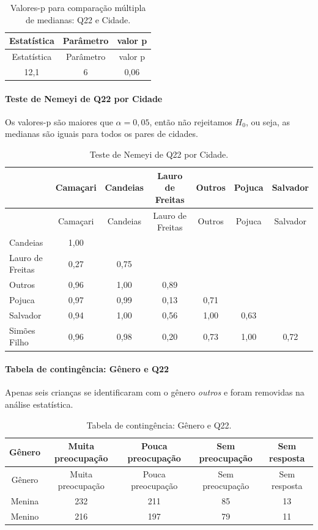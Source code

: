 \documentclass[]{article}
\let\oldparagraph\paragraph
\renewcommand{\paragraph}[1]{\oldparagraph{#1}\mbox{}}
\begin{document}
\begin{longtable}[]{@{}ccc@{}}
\caption{\label{tab:unnamed-chunk-369}Valores-p para comparação múltipla de medianas: Q22 e Cidade.}\tabularnewline
\toprule
Estatística & Parâmetro & valor p\tabularnewline
\midrule
\endfirsthead
\toprule
Estatística & Parâmetro & valor p\tabularnewline
\midrule
\endhead
12,1 & 6 & 0,06\tabularnewline
\bottomrule
\end{longtable}

\hypertarget{teste-de-nemeyi-de-q22-por-cidade}{%
\paragraph{Teste de Nemeyi de Q22 por Cidade}\label{teste-de-nemeyi-de-q22-por-cidade}}

Os valores-p são maiores que \(\alpha=0,05\), então não rejeitamos \(H_0\), ou seja, as medianas são iguais para todos os pares de cidades.

\begin{longtable}[]{@{}lcccccc@{}}
\caption{\label{tab:unnamed-chunk-370}Teste de Nemeyi de Q22 por Cidade.}\tabularnewline
\toprule
& Camaçari & Candeias & Lauro de Freitas & Outros & Pojuca & Salvador\tabularnewline
\midrule
\endfirsthead
\toprule
& Camaçari & Candeias & Lauro de Freitas & Outros & Pojuca & Salvador\tabularnewline
\midrule
\endhead
Candeias & 1,00 & & & & &\tabularnewline
Lauro de Freitas & 0,27 & 0,75 & & & &\tabularnewline
Outros & 0,96 & 1,00 & 0,89 & & &\tabularnewline
Pojuca & 0,97 & 0,99 & 0,13 & 0,71 & &\tabularnewline
Salvador & 0,94 & 1,00 & 0,56 & 1,00 & 0,63 &\tabularnewline
Simões Filho & 0,96 & 0,98 & 0,20 & 0,73 & 1,00 & 0,72\tabularnewline
\bottomrule
\end{longtable}

\cleardoublepage

\hypertarget{tabela-de-continguxeancia-guxeanero-e-q22}{%
\paragraph{Tabela de contingência: Gênero e Q22}\label{tabela-de-continguxeancia-guxeanero-e-q22}}

Apenas seis crianças se identificaram com o gênero \emph{outros} e foram removidas na análise estatística.

\begin{longtable}[]{@{}ccccc@{}}
\caption{\label{tab:unnamed-chunk-371}Tabela de contingência: Gênero e Q22.}\tabularnewline
\toprule
Gênero & Muita preocupação & Pouca preocupação & Sem preocupação & Sem resposta\tabularnewline
\midrule
\endfirsthead
\toprule
Gênero & Muita preocupação & Pouca preocupação & Sem preocupação & Sem resposta\tabularnewline
\midrule
\endhead
Menina & 232 & 211 & 85 & 13\tabularnewline
Menino & 216 & 197 & 79 & 11\tabularnewline
\bottomrule
\end{longtable}
\end{document}
